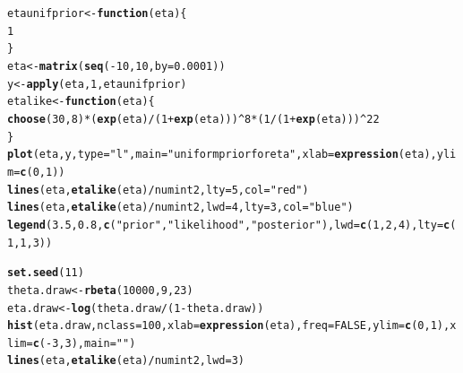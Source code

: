 \documentclass[12pt]{article}\usepackage[]{graphicx}\usepackage[]{color}
\makeatletter
\newcommand{\hlnum}[1]{\textcolor[rgb]{0.686,0.059,0.569}{#1}}%
\newcommand{\hlstr}[1]{\textcolor[rgb]{0.192,0.494,0.8}{#1}}%
\newcommand{\hlopt}[1]{\textcolor[rgb]{0,0,0}{#1}}%
\newcommand{\hlstd}[1]{\textcolor[rgb]{0.345,0.345,0.345}{#1}}%
\newcommand{\hlkwa}[1]{\textcolor[rgb]{0.161,0.373,0.58}{\textbf{#1}}}%
\newcommand{\hlkwb}[1]{\textcolor[rgb]{0.69,0.353,0.396}{#1}}%
\newcommand{\hlkwc}[1]{\textcolor[rgb]{0.333,0.667,0.333}{#1}}%
\newcommand{\hlkwd}[1]{\textcolor[rgb]{0.737,0.353,0.396}{\textbf{#1}}}%
\newenvironment{kframe}{%
 \def\at@end@of@kframe{}%
 \ifinner\ifhmode%
  \def\at@end@of@kframe{\end{minipage}}%
  \begin{minipage}{\columnwidth}%
 \fi\fi%
 \def\FrameCommand##1{\hskip\@totalleftmargin \hskip-\fboxsep
 \colorbox{shadecolor}{##1}\hskip-\fboxsep
     \hskip-\linewidth \hskip-\@totalleftmargin \hskip\columnwidth}%
 \MakeFramed {\advance\hsize-\width
   \@totalleftmargin\z@ \linewidth\hsize
   \@setminipage}}%
 {\par\unskip\endMakeFramed%
 \at@end@of@kframe}
\newenvironment{knitrout}{}{} %
\makeatother
\begin{document}
\begin{knitrout}\footnotesize
{}\color{fgcolor}\begin{kframe}
\begin{alltt}
\hlstd{etaunifprior} \hlkwb{<-} \hlkwa{function}\hlstd{(}\hlkwc{eta}\hlstd{) \{}
  \hlnum{1}
\hlstd{\}}
\hlstd{eta} \hlkwb{<-} \hlkwd{matrix}\hlstd{(}\hlkwd{seq}\hlstd{(}\hlopt{-}\hlnum{10}\hlstd{,} \hlnum{10}\hlstd{,} \hlkwc{by}\hlstd{=}\hlnum{0.0001}\hlstd{))}
\hlstd{y} \hlkwb{<-} \hlkwd{apply}\hlstd{(eta,} \hlnum{1}\hlstd{, etaunifprior)}
\hlstd{etalike} \hlkwb{<-} \hlkwa{function}\hlstd{(}\hlkwc{eta}\hlstd{)\{}
  \hlkwd{choose}\hlstd{(}\hlnum{30}\hlstd{,} \hlnum{8}\hlstd{)}\hlopt{*}\hlstd{(}\hlkwd{exp}\hlstd{(eta)}\hlopt{/}\hlstd{(}\hlnum{1}\hlopt{+}\hlkwd{exp}\hlstd{(eta)))}\hlopt{^}\hlnum{8}\hlopt{*}\hlstd{(}\hlnum{1}\hlopt{/}\hlstd{(}\hlnum{1}\hlopt{+}\hlkwd{exp}\hlstd{(eta)))}\hlopt{^}\hlnum{22}
\hlstd{\}}
\hlkwd{plot}\hlstd{(eta, y,} \hlkwc{type}\hlstd{=}\hlstr{"l"}\hlstd{,} \hlkwc{main}\hlstd{=}\hlstr{"uniform prior for eta"}\hlstd{,} \hlkwc{xlab}\hlstd{=}\hlkwd{expression}\hlstd{(eta),} \hlkwc{ylim}\hlstd{=}\hlkwd{c}\hlstd{(}\hlnum{0}\hlstd{,}\hlnum{1}\hlstd{))}
\hlkwd{lines}\hlstd{(eta,} \hlkwd{etalike}\hlstd{(eta)}\hlopt{/}\hlstd{numint2,} \hlkwc{lty}\hlstd{=}\hlnum{5}\hlstd{,} \hlkwc{col}\hlstd{=}\hlstr{"red"}\hlstd{)}
\hlkwd{lines}\hlstd{(eta,} \hlkwd{etalike}\hlstd{(eta)}\hlopt{/}\hlstd{numint2,} \hlkwc{lwd}\hlstd{=}\hlnum{4}\hlstd{,} \hlkwc{lty}\hlstd{=}\hlnum{3}\hlstd{,} \hlkwc{col}\hlstd{=}\hlstr{"blue"}\hlstd{)}
\hlkwd{legend}\hlstd{(}\hlnum{3.5}\hlstd{,} \hlnum{0.8}\hlstd{,} \hlkwd{c}\hlstd{(}\hlstr{"prior"}\hlstd{,} \hlstr{"likelihood"}\hlstd{,} \hlstr{"posterior"}\hlstd{),} \hlkwc{lwd}\hlstd{=}\hlkwd{c}\hlstd{(}\hlnum{1}\hlstd{,}\hlnum{2}\hlstd{,}\hlnum{4}\hlstd{),} \hlkwc{lty}\hlstd{=}\hlkwd{c}\hlstd{(}\hlnum{1}\hlstd{,}\hlnum{1}\hlstd{,}\hlnum{3}\hlstd{))}
\end{alltt}
\end{kframe}
\end{knitrout}

\begin{knitrout}\footnotesize
{}\color{fgcolor}\begin{kframe}
\begin{alltt}
\hlkwd{set.seed}\hlstd{(}\hlnum{11}\hlstd{)}
\hlstd{theta.draw} \hlkwb{<-} \hlkwd{rbeta}\hlstd{(}\hlnum{10000}\hlstd{,} \hlnum{9}\hlstd{,} \hlnum{23}\hlstd{)}
\hlstd{eta.draw} \hlkwb{<-} \hlkwd{log}\hlstd{(theta.draw}\hlopt{/}\hlstd{(}\hlnum{1}\hlopt{-}\hlstd{theta.draw))}
\hlkwd{hist}\hlstd{(eta.draw,} \hlkwc{nclass}\hlstd{=}\hlnum{100}\hlstd{,} \hlkwc{xlab}\hlstd{=}\hlkwd{expression}\hlstd{(eta),} \hlkwc{freq}\hlstd{=}\hlnum{FALSE}\hlstd{,} \hlkwc{ylim}\hlstd{=}\hlkwd{c}\hlstd{(}\hlnum{0}\hlstd{,}\hlnum{1}\hlstd{),} \hlkwc{xlim}\hlstd{=}\hlkwd{c}\hlstd{(}\hlopt{-}\hlnum{3}\hlstd{,}\hlnum{3}\hlstd{),} \hlkwc{main}\hlstd{=}\hlstr{""}\hlstd{)}
\hlkwd{lines}\hlstd{(eta,} \hlkwd{etalike}\hlstd{(eta)}\hlopt{/}\hlstd{numint2,} \hlkwc{lwd}\hlstd{=}\hlnum{3}\hlstd{)}
\end{alltt}
\end{kframe}
\end{knitrout}
\end{document}
